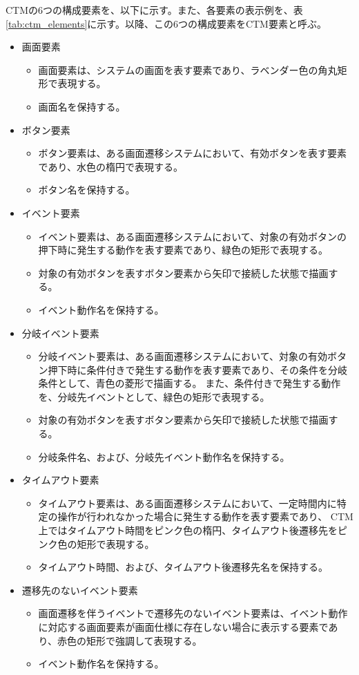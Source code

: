 CTMの6つの構成要素を、以下に示す。また、各要素の表示例を、表\ref{tab:ctm_elements}に示す。以降、この6つの構成要素をCTM要素と呼ぶ。
\begin{itemize}
  \item 画面要素
  \begin{itemize}
    \item 画面要素は、システムの画面を表す要素であり、ラベンダー色の角丸矩形で表現する。
    \item 画面名を保持する。
  \end{itemize}
  \item ボタン要素
  \begin{itemize}
    \item ボタン要素は、ある画面遷移システムにおいて、有効ボタンを表す要素であり、水色の楕円で表現する。
    \item ボタン名を保持する。
  \end{itemize}
  \item イベント要素
  \begin{itemize}
    \item イベント要素は、ある画面遷移システムにおいて、対象の有効ボタンの押下時に発生する動作を表す要素であり、緑色の矩形で表現する。
    \item 対象の有効ボタンを表すボタン要素から矢印で接続した状態で描画する。
    \item イベント動作名を保持する。
  \end{itemize}
  \item 分岐イベント要素
  \begin{itemize}
    \item 分岐イベント要素は、ある画面遷移システムにおいて、対象の有効ボタン押下時に条件付きで発生する動作を表す要素であり、その条件を分岐条件として、青色の菱形で描画する。
    また、条件付きで発生する動作を、分岐先イベントとして、緑色の矩形で表現する。
    \item 対象の有効ボタンを表すボタン要素から矢印で接続した状態で描画する。
    \item 分岐条件名、および、分岐先イベント動作名を保持する。
  \end{itemize}
  \item タイムアウト要素
  \begin{itemize}
    \item タイムアウト要素は、ある画面遷移システムにおいて、一定時間内に特定の操作が行われなかった場合に発生する動作を表す要素であり、
    CTM上ではタイムアウト時間をピンク色の楕円、タイムアウト後遷移先をピンク色の矩形で表現する。
    \item タイムアウト時間、および、タイムアウト後遷移先名を保持する。
    \end{itemize}
  \item 遷移先のないイベント要素
  \begin{itemize}
    \item 画面遷移を伴うイベントで遷移先のないイベント要素は、イベント動作に対応する画面要素が画面仕様に存在しない場合に表示する要素であり、赤色の矩形で強調して表現する。
    \item イベント動作名を保持する。
    \end{itemize}
\end{itemize}

